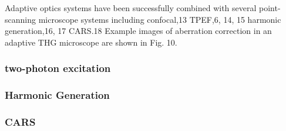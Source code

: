 Adaptive optics systems have been successfully combined with several point-
scanning microscope systems including confocal,13 TPEF,6, 14, 15 harmonic 
generation,16, 17 CARS.18 Example images of aberration correction in an 
adaptive THG microscope are shown in Fig. 10.

\cite{book_confocal}

\cite{confocal_microscope}


\subsubsection{two-photon excitation}
\label{sec:twoPhotonExcitation}

\cite{TPFM_gated_wavefront}
\cite{TPFM_image_based}
\cite{TPFM_pratical}

\subsubsection{Harmonic Generation}
\label{sec:HarmonicGeneration}

\cite{HG_embryos}
\cite{HG_dynamic}


\subsubsection{CARS}
\label{sec:CARS}

\cite{CARS}



